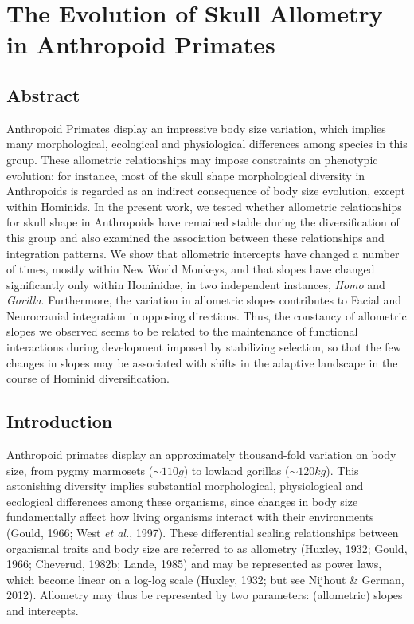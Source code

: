 \documentclass[12pt,twoside]{report}
\begin{document}
\newpage
\chapter{The Evolution of Skull Allometry in Anthropoid Primates}
\label{ch:allo}

\section{Abstract}\label{abstract-1}

Anthropoid Primates display an impressive body size variation, which
implies many morphological, ecological and physiological differences
among species in this group. These allometric relationships may impose
constraints on phenotypic evolution; for instance, most of the skull
shape morphological diversity in Anthropoids is regarded as an indirect
consequence of body size evolution, except within Hominids. In the
present work, we tested whether allometric relationships for skull shape
in Anthropoids have remained stable during the diversification of this
group and also examined the association between these relationships and
integration patterns. We show that allometric intercepts have changed a
number of times, mostly within New World Monkeys, and that slopes have
changed significantly only within Hominidae, in two independent
instances, \emph{Homo} and \emph{Gorilla}. Furthermore, the variation in
allometric slopes contributes to Facial and Neurocranial integration in
opposing directions. Thus, the constancy of allometric slopes we
observed seems to be related to the maintenance of functional
interactions during development imposed by stabilizing selection, so
that the few changes in slopes may be associated with shifts in the
adaptive landscape in the course of Hominid diversification.

\section{Introduction}\label{introduction-1}

Anthropoid primates display an approximately thousand-fold variation on
body size, from pygmy marmosets ($\sim 110g$) to lowland gorillas
($\sim 120kg$). This astonishing diversity implies substantial
morphological, physiological and ecological differences among these
organisms, since changes in body size fundamentally affect how living
organisms interact with their environments (Gould, 1966; West \emph{et
al.}, 1997). These differential scaling relationships between organismal
traits and body size are referred to as allometry (Huxley, 1932; Gould,
1966; Cheverud, 1982b; Lande, 1985) and may be represented as power
laws, which become linear on a log-log scale (Huxley, 1932; but see
Nijhout \& German, 2012). Allometry may thus be represented by two
parameters: (allometric) slopes and intercepts.
\end{document}
